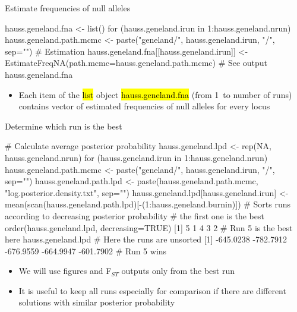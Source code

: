 \documentclass[compress, ucs, xelatex, 11pt, xcolor=svgnames,
  hyperref={
    bookmarks=true,
    unicode=true,
    colorlinks=true,
    pdftitle={Molecular data in R},
    plainpages=false,
    pdfauthor={Vojtech Zeisek},
    pdfsubject={Course about phylogeny and evolution in R},
    pdfcreator={XeLaTeX},
    pdfkeywords={R, evolution, phylogeny, molecular data},
    linkcolor=Tomato,
    anchorcolor=SaddleBrown,
    citecolor=Goldenrod,
    filecolor=DarkMagenta,
    menucolor=Sienna,
    urlcolor=DarkTurquoise,
    pdftex},
  url={hyphens, lowtilde} %
  ]{beamer}
\renewcommand{\texttt}[1]{\hl{\ttfamily #1}}
\begin{document}
\begin{frame}[fragile]{Estimate frequencies of null alleles}
  \begin{spluscode}
    hauss.geneland.fna <- list()
    for (hauss.geneland.irun in 1:hauss.geneland.nrun) {
      hauss.geneland.path.mcmc <- paste("geneland/", hauss.geneland.irun, 
        "/", sep="")
      # Estimation
      hauss.geneland.fna[[hauss.geneland.irun]] <- 
        EstimateFreqNA(path.mcmc=hauss.geneland.path.mcmc)
      }
    # See output
    hauss.geneland.fna
  \end{spluscode}
  \begin{itemize}
    \item Each item of the \texttt{list} object \texttt{hauss.geneland.fna} (from 1~to number of runs) contains vector of estimated frequencies of null alleles for every locus
  \end{itemize}
\end{frame}

\begin{frame}[fragile]{Determine which run is the best}
  \begin{spluscode}
    # Calculate average posterior probability
    hauss.geneland.lpd <- rep(NA, hauss.geneland.nrun)
    for (hauss.geneland.irun in 1:hauss.geneland.nrun) {
      hauss.geneland.path.mcmc <- paste("geneland/",
        hauss.geneland.irun, "/", sep="")
      hauss.geneland.path.lpd <- paste(hauss.geneland.path.mcmc,
        "log.posterior.density.txt", sep="")
      hauss.geneland.lpd[hauss.geneland.irun] <- 
        mean(scan(hauss.geneland.path.lpd)[-(1:hauss.geneland.burnin)]) }
    # Sorts runs according to decreasing posterior probability
    # the first one is the best
    order(hauss.geneland.lpd, decreasing=TRUE)
    [1] 5 1 4 3 2 # Run 5 is the best here
    hauss.geneland.lpd # Here the runs are unsorted
    [1] -645.0238 -782.7912 -676.9559 -664.9947 -601.7902 # Run 5 wins
  \end{spluscode}
  \begin{itemize}
    \item We will use figures and F$_{ST}$ outputs only from the best run
    \item It is useful to keep all runs especially for comparison if there are different solutions with similar posterior probability
  \end{itemize}
\end{frame}
\end{document}
